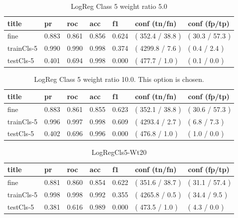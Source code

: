\documentclass[ms]{nuthesis}
\begin{document}
\FloatBarrier
\begin{table}[H]
\centering
\begin{tabular}{|l||l||l||l||l||l||l|}\toprule
title & pr & roc & acc & f1 & conf (tn/fn) & conf (fp/tp) \\ \midrule
fine & 0.883 & 0.861 & 0.856 & 0.624 & ( 352.4 / 38.8 ) & ( 30.3 / 57.3 ) \\
trainCls-5 & 0.990 & 0.990 & 0.998 & 0.374 & ( 4299.8 / 7.6 ) & ( 0.4 / 2.4 ) \\
testCls-5 & 0.401 & 0.694 & 0.998 & 0.000 & ( 477.7 / 1.0 ) & ( 0.1 / 0.0 ) \\ \bottomrule
\end{tabular}
\caption{LogReg Class 5 weight ratio 5.0}
\label{tab:LogRegCls5-Wt5}
\end{table}
\FloatBarrier

\FloatBarrier
\begin{table}[H]
\centering
\begin{tabular}{|l||l||l||l||l||l||l|}\toprule
title & pr & roc & acc & f1 & conf (tn/fn) & conf (fp/tp) \\ \midrule
fine & 0.883 & 0.861 & 0.855 & 0.623 & ( 352.1 / 38.8 ) & ( 30.6 / 57.3 ) \\
trainCls-5 & 0.996 & 0.997 & 0.998 & 0.609 & ( 4293.4 / 2.7 ) & ( 6.8 / 7.3 ) \\
testCls-5 & 0.402 & 0.696 & 0.996 & 0.000 & ( 476.8 / 1.0 ) & ( 1.0 / 0.0 ) \\ \bottomrule
\end{tabular}
\caption{LogReg Class 5 weight ratio 10.0. This option is chosen.}
\label{tab:LogRegCls5-Wt10}
\end{table}
\FloatBarrier

\FloatBarrier
\begin{table}[H]
\centering
\begin{tabular}{|l||l||l||l||l||l||l|}\toprule
title & pr & roc & acc & f1 & conf (tn/fn) & conf (fp/tp) \\ \midrule
fine & 0.881 & 0.860 & 0.854 & 0.622 & ( 351.6 / 38.7 ) & ( 31.1 / 57.4 ) \\
trainCls-5 & 0.998 & 0.998 & 0.992 & 0.355 & ( 4265.8 / 0.5 ) & ( 34.4 / 9.5 ) \\
testCls-5 & 0.381 & 0.616 & 0.989 & 0.000 & ( 473.5 / 1.0 ) & ( 4.3 / 0.0 ) \\ \bottomrule
\end{tabular}
\caption{LogRegCls5-Wt20}
\label{tab:LogRegCls5-Wt20}
\end{table}
\FloatBarrier
\end{document}
